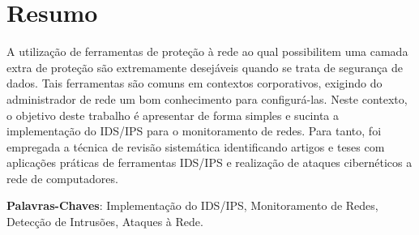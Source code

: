 \chapter[Resumo]{Resumo}
\label{chap:resumo}
	
	A utilização de ferramentas de proteção à rede ao qual possibilitem uma camada extra de proteção são extremamente desejáveis quando se trata de segurança de dados. Tais ferramentas são comuns em contextos corporativos, exigindo do administrador de rede um bom conhecimento para configurá-las. Neste contexto, o objetivo deste trabalho é apresentar de forma simples e sucinta a implementação do IDS/IPS para o monitoramento de redes. Para tanto, foi empregada a técnica de revisão sistemática identificando artigos e teses com aplicações práticas de ferramentas IDS/IPS e realização de ataques cibernéticos a rede de computadores.     
	
	\begin{flushleft}
		\textbf{Palavras-Chaves}: Implementação do IDS/IPS, Monitoramento de Redes, Detecção de Intrusões, Ataques à Rede.
	\end{flushleft}